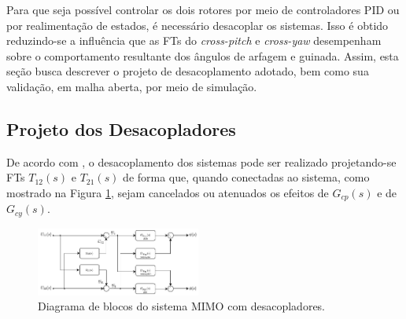 
Para que seja possível controlar os dois rotores por meio de controladores PID ou por realimentação de estados, é necessário desacoplar os sistemas. Isso é obtido reduzindo-se a influência que as FTs do \textit{cross-pitch} e \textit{cross-yaw} desempenham sobre o comportamento resultante dos ângulos de arfagem e guinada. Assim, esta seção busca descrever o projeto de desacoplamento adotado, bem como sua validação, em malha aberta, por meio de simulação.

\subsection{\textbf{Projeto dos Desacopladores}}

De acordo com \cite{seborg2010process}, o desacoplamento dos sistemas pode ser realizado projetando-se FTs $T_{12}(s)$ e $T_{21}(s)$ de forma que, quando conectadas ao sistema, como mostrado na Figura \ref{fig:ProjetoDesacopla}, sejam cancelados ou atenuados os efeitos de $G_{cp}(s)$ e de $G_{cy}(s)$.

\begin{figure}[H]
    \centering
    \includegraphics[width=0.48\textwidth]{figures/Desacoplamento/Desacoplamento.pdf}
    \caption{Diagrama de blocos do sistema MIMO com desacopladores.}
    \label{fig:ProjetoDesacopla}
\end{figure}

